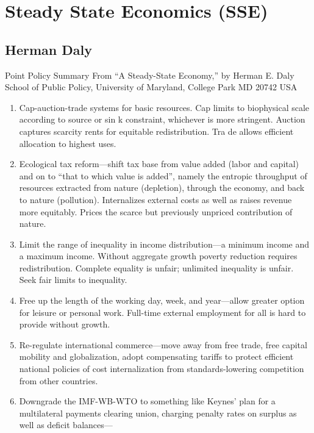 \documentclass[
]{book}
\begin{document}
\hypertarget{steady-state-economics-sse}{%
\chapter{Steady State Economics (SSE)}\label{steady-state-economics-sse}}

\hypertarget{herman-daly}{%
\section{Herman Daly}\label{herman-daly}}

Point Policy Summary
From ``A Steady-State Economy,'' by Herman E. Daly
School of Public Policy, University of Maryland, College Park MD 20742 USA

\begin{enumerate}
\def\labelenumi{\arabic{enumi}.}
\item
  Cap-auction-trade systems for basic resources. Cap limits to biophysical scale according to source or sin
  k constraint, whichever is more stringent. Auction captures scarcity rents for equitable redistribution. Tra
  de allows efficient allocation to highest uses.
\item
  Ecological tax reform---shift tax base from value added (labor and capital) and on to
  ``that to which value is added'', namely the entropic throughput of resources extracted
  from nature (depletion), through the economy, and back to nature (pollution).
  Internalizes external costs as well as raises revenue more equitably. Prices the scarce but
  previously unpriced contribution of nature.
\item
  Limit the range of inequality in income distribution---a minimum income and a
  maximum income. Without aggregate growth poverty reduction requires redistribution.
  Complete equality is unfair; unlimited inequality is unfair. Seek fair limits to inequality.
\item
  Free up the length of the working day, week, and year---allow greater option for
  leisure or personal work. Full-time external employment for all is hard to provide
  without growth.
\item
  Re-regulate international commerce---move away from free trade, free capital
  mobility and globalization, adopt compensating tariffs to protect efficient national
  policies of cost internalization from standards-lowering competition from other
  countries.
\item
  Downgrade the IMF-WB-WTO to something like Keynes' plan for a multilateral
  payments clearing union, charging penalty rates on surplus as well as deficit balances---

\end{enumerate}
\end{document}
